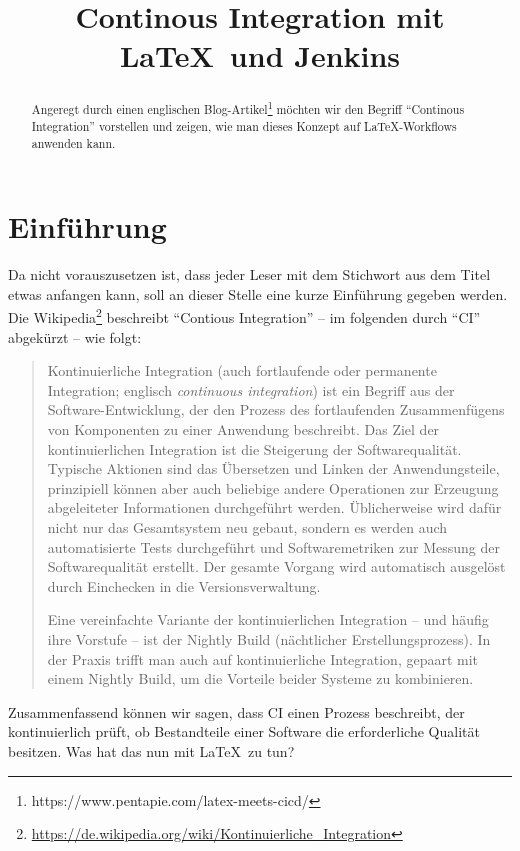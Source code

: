 \documentclass{dtk}
\title{Continous Integration mit \LaTeX\ und Jenkins}
\begin{document}
\maketitle

\begin{abstract}
Angeregt durch einen englischen Blog-Artikel\footnote{https://www.pentapie.com/latex-meets-cicd/} möchten wir den Begriff \enquote{Continous Integration} vorstellen und zeigen, wie man dieses Konzept auf \LaTeX-Workflows anwenden kann.
\end{abstract}

\section{Einführung}

Da nicht vorauszusetzen ist, dass jeder Leser mit dem Stichwort aus dem Titel etwas anfangen kann, soll an dieser Stelle eine kurze Einführung gegeben werden. Die Wikipedia\footnote{\url{https://de.wikipedia.org/wiki/Kontinuierliche_Integration}} beschreibt \enquote{Contious Integration} -- im folgenden durch \enquote{CI} abgekürzt -- wie folgt:

\begin{quote}
Kontinuierliche Integration (auch fortlaufende oder permanente Integration; englisch \textit{continuous integration}) ist ein Begriff aus der Software-Entwicklung, der den Prozess des fortlaufenden Zusammenfügens von Komponenten zu einer Anwendung beschreibt. Das Ziel der kontinuierlichen Integration ist die Steigerung der Softwarequalität. Typische Aktionen sind das Übersetzen und Linken der Anwendungsteile, prinzipiell können aber auch beliebige andere Operationen zur Erzeugung abgeleiteter Informationen durchgeführt werden. Üblicherweise wird dafür nicht nur das Gesamtsystem neu gebaut, sondern es werden auch automatisierte Tests durchgeführt und Softwaremetriken zur Messung der Softwarequalität erstellt. Der gesamte Vorgang wird automatisch ausgelöst durch Einchecken in die Versionsverwaltung.

Eine vereinfachte Variante der kontinuierlichen Integration -- und häufig ihre Vorstufe -- ist der Nightly Build (nächtlicher Erstellungsprozess). In der Praxis trifft man auch auf kontinuierliche Integration, gepaart mit einem Nightly Build, um die Vorteile beider Systeme zu kombinieren.
\end{quote}

Zusammenfassend können wir sagen, dass CI einen Prozess beschreibt, der kontinuierlich prüft, ob Bestandteile einer Software die erforderliche Qualität besitzen. Was hat das nun mit \LaTeX\ zu tun? 
\end{document}
